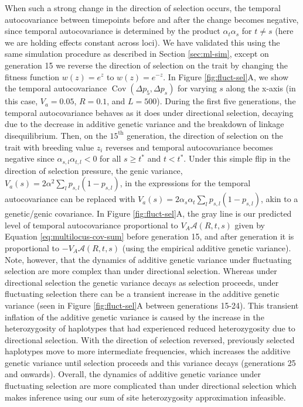 \documentclass[11pt]{article}
\DeclareMathOperator{\cov}{Cov}
\begin{document}
When such a strong change in the direction of selection occurs, the temporal
autocovariance between timepoints before and after the change becomes negative,
since temporal autocovariance is determined by the product $\alpha_{t}
\alpha_{s}$ for $t \ne s$ (here we are holding effects constant across loci).
We have validated this using the same simulation procedure as described in
Section \ref{sec:ml-sim}, except on generation 15 we reverse the direction of
selection on the trait by changing the fitness function $w(z) = e^z$ to $w(z) =
e^{-z}$. In Figure \ref{fig:fluct-sel}A, we show the temporal autocovariance
$\cov(\Delta p_5, \Delta p_s)$ for varying $s$ along the x-axis (in this case,
$V_a=0.05$, $R=0.1$, and $L=500$). During the first five generations, the
temporal autocovariance behaves as it does under directional selection,
decaying due to the decrease in additive genetic variance and the breakdown of
linkage disequilibrium. Then, on the $15^\text{th}$ generation, the direction
of selection on the trait with breeding value $z_i$ reverses and temporal
autocovariance becomes negative since $\alpha_{s,l} \alpha_{t,l} < 0$ for all
$s \ge t^*$ and $t < t^*$. Under this simple flip in the direction of selection
pressure, the genic variance, $V_a(s) = 2 \alpha^2 \sum_l p_{s,l}(1-p_{s,l})$,
in the expressions for the temporal autocovariance can be replaced with $V_a(s)
= 2 \alpha_s \alpha_t \sum_l p_{s,l}(1-p_{s,l})$, akin to a genetic/genic
covariance.  In Figure \ref{fig:fluct-sel}A, the gray line is our predicted
level of temporal autocovariance proportional to $V_A \mathcal{A}(R,t, s)$
given by Equation \eqref{eq:multilocus-cov-sum} before generation 15, and after
generation it is proportional to $-V_A \mathcal{A}(R,t, s)$ (using the
empirical additive genetic variance).  Note, however, that the dynamics of
additive genetic variance under fluctuating selection are more complex than
under directional selection.  Whereas under directional selection the genetic
variance decays as selection proceeds, under fluctuating selection there can be
a transient increase in the additive genetic variance (seen in Figure
\ref{fig:fluct-sel}A between generations 15-24).  This transient inflation
of the additive genetic variance is caused by the increase in the
heterozygosity of haplotypes that had experienced reduced heterozygosity due to
directional selection. With the direction of selection reversed, previously
selected haplotypes move to more intermediate frequencies, which increases the
additive genetic variance until selection proceeds and this variance decays
(generations 25 and onwards).  Overall, the dynamics of additive genetic
variance under fluctuating selection are more complicated than under
directional selection which makes inference using our sum of site
heterozygosity approximation infeasible.
\end{document}
